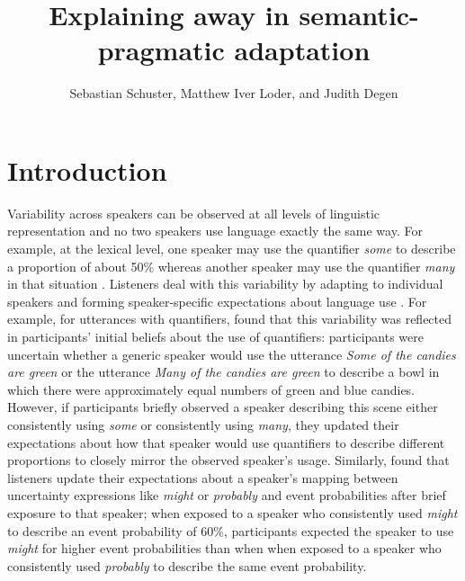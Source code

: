 \documentclass[man,floatsintext]{apa6}
\title{Explaining away in semantic-pragmatic adaptation}
\author{Sebastian Schuster, Matthew Iver Loder, and Judith Degen}
\affiliation{Department of Linguistics, Stanford University}
\begin{document}
\maketitle



\section{Introduction}

Variability across speakers can be observed at all levels of linguistic representation and no two speakers use language exactly the same way. For example, at the lexical level, one speaker may use the  quantifier \textit{some} to describe a proportion of about 50\% whereas another speaker may use the quantifier \textit{many} in that situation \cite{Yildirim2016}. Listeners deal with this variability by adapting to individual speakers and forming speaker-specific expectations about language use \cite[inter alia]{Norris2003,Kraljic2005,Bradlow2008,Kurumada2012,Kamide2012,Kleinschmidt2015,Fine2016,Roettger2019}. For example, for utterances with quantifiers,   found that this variability was reflected in participants' initial beliefs about the use of quantifiers: participants were uncertain whether a generic speaker would use the utterance \textit{Some of the candies are green} or the utterance \textit{Many of the candies are green} to describe a bowl in which there were approximately equal numbers of green and blue candies. However, if participants briefly observed a speaker describing this scene either consistently using \textit{some} or consistently using \textit{many}, they updated their expectations about how that speaker would use quantifiers to describe different proportions to closely mirror the observed speaker's usage. Similarly,  found that listeners update their expectations about a speaker's mapping between uncertainty expressions like \textit{might} or \textit{probably} and event probabilities after brief exposure to that speaker; when exposed to a speaker who consistently used \textit{might} to describe an event probability of 60\%, participants expected the speaker to use \textit{might} for higher event probabilities than when when exposed to a speaker who consistently used \textit{probably} to describe the same event probability.
\end{document}
